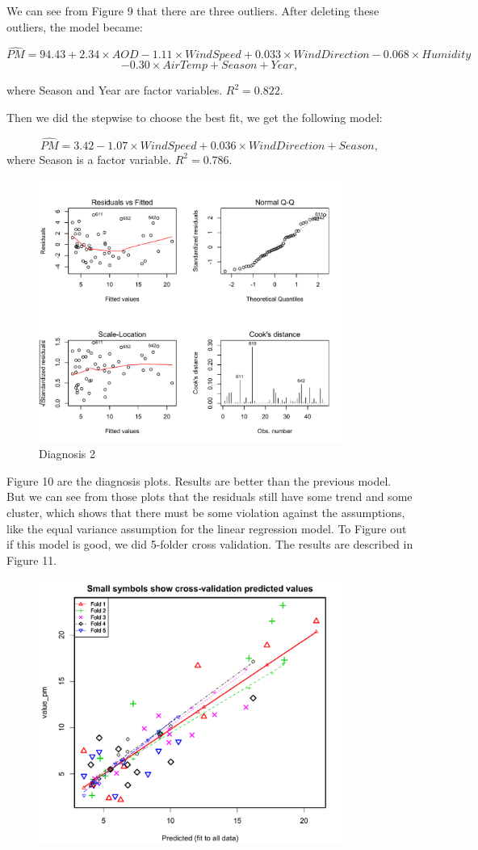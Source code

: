 \documentclass[10pt]{article}
\begin{document}
We can see from Figure 9 that there are three outliers. After deleting these outliers, the model became:

$$\hat{PM} = 94.43 + 2.34\times AOD - 1.11\times WindSpeed + 0.033\times WindDirection - 0.068\times Humidity $$
$$- 0.30\times AirTemp + Season + Year, $$

where Season and Year are factor variables. $R^2 = 0.822$.

Then we did the stepwise to choose the best fit, we get the following model:

$$\hat{PM} = 3.42 -1.07\times WindSpeed + 0.036\times WindDirection + Season, $$
where Season is a factor variable. $R^2 = 0.786$.

\begin{figure}[H]
\centering
\includegraphics[width = 100mm ]{residual2.pdf}
\caption{Diagnosis 2}
\label{d2}
\end{figure}

Figure 10 are the diagnosis plots. Results are better than the previous model. But we can see from those plots that the residuals still have some trend and some cluster, which shows that there must be some violation against the assumptions, like the equal variance assumption for the linear regression model. To Figure out if this model is good, we did 5-folder cross validation. The results are described in Figure 11. 

\begin{figure}[H]
\centering
\includegraphics[width = 100mm]{cv_lm.pdf}
\caption{}
\end{figure}
\end{document}
